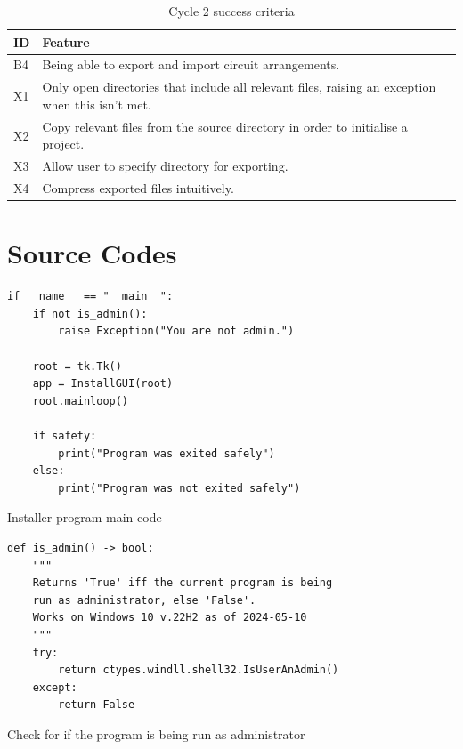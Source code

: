 \documentclass[11pt]{article}
\begin{document}
        \newpage
        \begin{table}[!h]
            \centering
            \begin{tabular}{@{}lp{425pt}@{}}\toprule
                \textbf{ID} & \textbf{Feature} \\ \midrule
                B4 & Being able to export and import circuit arrangements. \\ 
                X1 & Only open directories that include all relevant files, raising an exception when this isn't met. \\ 
                X2 & Copy relevant files from the source directory in order to initialise a project. \\ 
                X3 & Allow user to specify directory for exporting. \\ 
                X4 & Compress exported files intuitively. \\
                \bottomrule
            \end{tabular}
            \caption{Cycle 2 success criteria}
            \label{tbl:succ_crit_c2}
        \end{table}


    \newpage


    \section{Source Codes}

        \begin{listing}[!ht]
            \begin{verbatim}
if __name__ == "__main__":
    if not is_admin():
        raise Exception("You are not admin.")
        
    root = tk.Tk()
    app = InstallGUI(root)
    root.mainloop()
    
    if safety:
        print("Program was exited safely")
    else:
        print("Program was not exited safely")
            \end{verbatim}
            \caption{Installer program main code}
            \label{sc:if_name_main_c1}
        \end{listing}


        \newpage
        \begin{listing}[!ht]
            \begin{verbatim}
def is_admin() -> bool:
    """
    Returns 'True' iff the current program is being 
    run as administrator, else 'False'. 
    Works on Windows 10 v.22H2 as of 2024-05-10
    """
    try:
        return ctypes.windll.shell32.IsUserAnAdmin()
    except:
        return False
            \end{verbatim}
            \caption{Check for if the program is being run as administrator}
            \label{sc:admin_checker}
        \end{listing}
\end{document}
